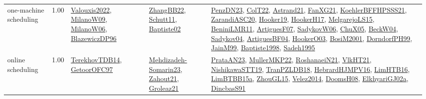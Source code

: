 {\begin{longtable}{p{3cm}r>{\raggedright\arraybackslash}p{6cm}>{\raggedright\arraybackslash}p{6cm}>{\raggedright\arraybackslash}p{8cm}}
\index{one-machine scheduling}\index{Concepts!one-machine scheduling}one-machine scheduling &  1.00 & \hyperref[detail:Valouxis2022]{Valouxis2022}, \hyperref[detail:MilanoW09]{MilanoW09}, \hyperref[detail:MilanoW06]{MilanoW06}, \hyperref[detail:BlazewiczDP96]{BlazewiczDP96} & \hyperref[detail:ZhangBB22]{ZhangBB22}, \hyperref[detail:Schutt11]{Schutt11}, \hyperref[detail:Baptiste02]{Baptiste02} & \hyperref[detail:PenzDN23]{PenzDN23}, \hyperref[detail:ColT22]{ColT22}, \hyperref[detail:Astrand21]{Astrand21}, \hyperref[detail:FanXG21]{FanXG21}, \hyperref[detail:KoehlerBFFHPSSS21]{KoehlerBFFHPSSS21}, \hyperref[detail:ZarandiASC20]{ZarandiASC20}, \hyperref[detail:Hooker19]{Hooker19}, \hyperref[detail:HookerH17]{HookerH17}, \hyperref[detail:MelgarejoLS15]{MelgarejoLS15}, \hyperref[detail:BeniniLMR11]{BeniniLMR11}, \hyperref[detail:ArtiguesF07]{ArtiguesF07}, \hyperref[detail:SadykovW06]{SadykovW06}, \hyperref[detail:ChuX05]{ChuX05}, \hyperref[detail:BeckW04]{BeckW04}, \hyperref[detail:Sadykov04]{Sadykov04}, \hyperref[detail:ArtiguesBF04]{ArtiguesBF04}, \hyperref[detail:HookerO03]{HookerO03}, \hyperref[detail:BosiM2001]{BosiM2001}, \hyperref[detail:DorndorfPH99]{DorndorfPH99}, \hyperref[detail:JainM99]{JainM99}, \hyperref[detail:Baptiste1998]{Baptiste1998}, \hyperref[detail:Sadeh1995]{Sadeh1995}\\
\index{online scheduling}\index{Concepts!online scheduling}online scheduling &  1.00 & \hyperref[detail:TerekhovTDB14]{TerekhovTDB14}, \hyperref[detail:GetoorOFC97]{GetoorOFC97} & \hyperref[detail:Mehdizadeh-Somarin23]{Mehdizadeh-Somarin23}, \hyperref[detail:Zahout21]{Zahout21}, \hyperref[detail:Groleaz21]{Groleaz21} & \hyperref[detail:PrataAN23]{PrataAN23}, \hyperref[detail:MullerMKP22]{MullerMKP22}, \hyperref[detail:RoshanaeiN21]{RoshanaeiN21}, \hyperref[detail:VlkHT21]{VlkHT21}, \hyperref[detail:NishikawaSTT19]{NishikawaSTT19}, \hyperref[detail:TranPZLDB18]{TranPZLDB18}, \hyperref[detail:HebrardHJMPV16]{HebrardHJMPV16}, \hyperref[detail:LimHTB16]{LimHTB16}, \hyperref[detail:LimBTBB15a]{LimBTBB15a}, \hyperref[detail:ZhouGL15]{ZhouGL15}, \hyperref[detail:Velez2014]{Velez2014}, \hyperref[detail:DoomsH08]{DoomsH08}, \hyperref[detail:ElkhyariGJ02a]{ElkhyariGJ02a}, \hyperref[detail:DincbasS91]{DincbasS91}\\

\end{longtable}}
